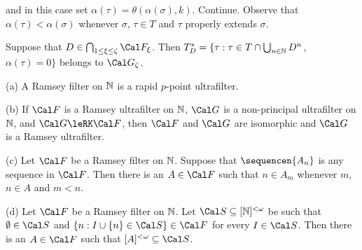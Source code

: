 
\noindent and in this case set $\alpha(\tau)=\theta(\alpha(\sigma),k)$.
Continue.   Observe that $\alpha(\tau)<\alpha(\sigma)$ whenever $\sigma$,
$\tau\in T$ and $\tau$ properly extends $\sigma$.

Suppose that $D\in\bigcap_{1\le\xi\le\zeta}\Cal F_{\xi}$.   Then
$T^*_D=\{\tau:\tau\in T\cap\bigcup_{n\in\Bbb N}D^n$, $\alpha(\tau)=0\}$
belongs to $\Cal G_{\zeta}$.

 (a) A Ramsey filter on $\Bbb N$ is a
rapid $p$-point ultrafilter.

(b) If $\Cal F$ is a Ramsey ultrafilter on $\Bbb N$, $\Cal G$ is a
non-principal ultrafilter on $\Bbb N$, and $\Cal G\leRK\Cal F$,
then $\Cal F$ and $\Cal G$ are isomorphic and $\Cal G$
is a Ramsey ultrafilter.

(c) Let $\Cal F$ be a Ramsey filter on $\Bbb N$.
Suppose that $\sequencen{A_n}$ is any sequence in $\Cal F$.   Then
there is an $A\in\Cal F$ such that $n\in A_m$ whenever $m$, $n\in A$ and
$m<n$.

(d) Let $\Cal F$ be a Ramsey filter on $\Bbb N$.   Let
$\Cal S\subseteq[\Bbb N]^{<\omega}$ be such that $\emptyset\in\Cal S$ and
$\{n:I\cup\{n\}\in\Cal S\}\in\Cal F$ for every $I\in\Cal S$.   Then there
is an $A\in\Cal F$ such that $[A]^{<\omega}\subseteq\Cal S$.

